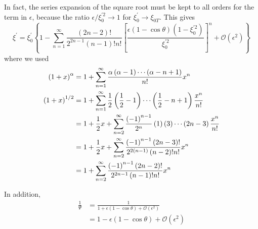 In fact, the series expansion of the square root must be kept to all orders
for the term in $\epsilon$, because the ratio $\epsilon/\xi_{0}^{\prime
2}\rightarrow1$ for $\xi_{0}^{\prime}\rightarrow\xi_{0T}$. This gives
\[
\xi^{\prime}=\xi_{0}^{\prime}\left\{ 1-\sum_{n=1}^{\infty}\frac{\left(
2n-2\right) !}{2^{2n-1}\left( n-1\right) !n!}\left[ \frac{\epsilon\left(
1-\cos\theta\right) \left( 1-\xi_{0}^{\prime2}\right) }{\xi_{0}^{\prime2}}%
\right] ^{n}+\mathcal{O}\left( \epsilon^{2}\right) \right\}
\]
where we used
\begin{align}
\left( 1+x\right) ^{\alpha} & =1+\sum_{n=1}^{\infty}\frac{\alpha\left(
\alpha-1\right) \cdots\left( \alpha-n+1\right) }{n!}x^{n} \\
\left( 1+x\right) ^{1/2} & =1+\sum_{n=1}^{\infty}\frac{1}{2}\left( \frac{1}{2%
}-1\right) \cdots\left( \frac{1}{2}-n+1\right) \frac{x^{n}}{n!} \\
& =1+\frac{1}{2}x+\sum_{n=2}^{\infty}\frac{\left( -1\right) ^{n-1}}{2^{n}}%
\left( 1\right) \left( 3\right) \cdots\left( 2n-3\right) \frac{x^{n}}{n!} \\
& =1+\frac{1}{2}x+\sum_{n=2}^{\infty}\frac{\left( -1\right) ^{n-1}\left(
2n-3\right) !}{2^{2\left( n-1\right) }\left( n-2\right) !n!}x^{n} \\
& =1+\sum_{n=2}^{\infty}\frac{\left( -1\right) ^{n-1}\left( 2n-2\right) !}{%
2^{2n-1}\left( n-1\right) !n!}x^{n}
\end{align}

In addition,
\begin{align}
\frac{1}{\Psi} & =\frac{1}{1+\epsilon\left( 1-\cos\theta\right) +\mathcal{O}%
\left( \epsilon^{2}\right) }  \nonumber \\
& =1-\epsilon\left( 1-\cos\theta\right) +\mathcal{O}\left( \epsilon
^{2}\right)
\end{align}

